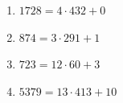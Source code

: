 %
%
    \begin{enumerate}
        \item \(\num{1728} = 4 \cdot 432 + 0\)
        \item \(874 = 3 \cdot 291 + 1\)
        \item \(723 = 12 \cdot 60 + 3\)
        \item \(\num{5379} = 13 \cdot 413 + 10\)
    \end{enumerate}
